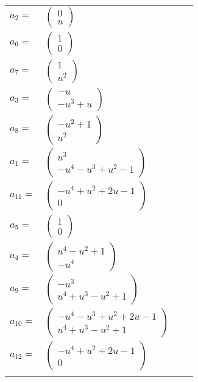\documentclass[1p]{elsarticle_modified}
\theoremstyle{definition}
\begin{document}
\begin{tabular}{m{7pt} m{180pt} m{7pt} m{180pt} }
\flushright $a_{2}=$&$\begin{pmatrix}0\\u\end{pmatrix}$ \\
\flushright $a_{6}=$&$\begin{pmatrix}1\\0\end{pmatrix}$ \\
\flushright $a_{7}=$&$\begin{pmatrix}1\\u^2\end{pmatrix}$ \\
\flushright $a_{3}=$&$\begin{pmatrix}- u\\- u^3+u\end{pmatrix}$ \\
\flushright $a_{8}=$&$\begin{pmatrix}- u^2+1\\u^2\end{pmatrix}$ \\
\flushright $a_{1}=$&$\begin{pmatrix}u^3\\- u^4- u^3+u^2-1\end{pmatrix}$ \\
\flushright $a_{11}=$&$\begin{pmatrix}- u^4+u^2+2 u-1\\0\end{pmatrix}$ \\
\flushright $a_{5}=$&$\begin{pmatrix}1\\0\end{pmatrix}$ \\
\flushright $a_{4}=$&$\begin{pmatrix}u^4- u^2+1\\- u^4\end{pmatrix}$ \\
\flushright $a_{9}=$&$\begin{pmatrix}- u^3\\u^4+u^3- u^2+1\end{pmatrix}$ \\
\flushright $a_{10}=$&$\begin{pmatrix}- u^4- u^3+u^2+2 u-1\\u^4+u^3- u^2+1\end{pmatrix}$ \\
\flushright $a_{12}=$&$\begin{pmatrix}- u^4+u^2+2 u-1\\0\end{pmatrix}$\\&\end{tabular}
\end{document}
